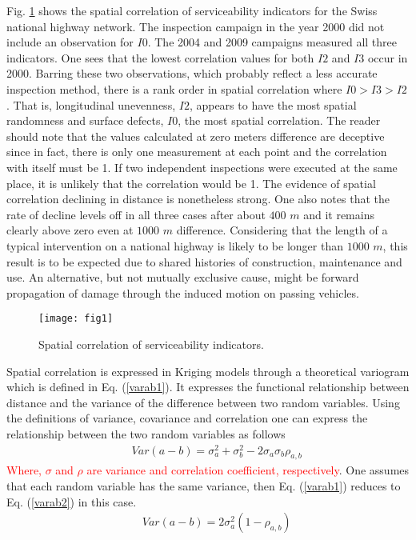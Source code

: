 \documentclass[Journal]{ascelike}
\begin{document}
Fig. \ref{fig1} shows the spatial correlation of serviceability indicators for the Swiss national highway network. The 
inspection campaign in the year 2000 did not include an observation for $I0$. The 2004 and 2009 campaigns measured all three indicators. One sees that the lowest correlation values for both $I2$ and $I3$ occur in 2000. Barring these two observations, which probably reflect a less accurate inspection method, there is a rank order in spatial correlation where $I0 > I3 > I2$. That is, longitudinal unevenness, $I2$, appears to have the most spatial randomness and surface defects, $I0$, the most spatial correlation. The reader should note that the values calculated at zero meters difference are deceptive since in fact, there is only one measurement at each point and the correlation with itself must be 1. If two independent inspections were executed at the same place, it is unlikely that the correlation would be 1. The evidence of spatial correlation declining in distance is nonetheless strong. One also notes that the rate of decline levels off in all three cases after about $400$ $m$ and it remains clearly above zero even at $1000$ $m$ difference. Considering that the length of a typical intervention on a national highway is likely to be longer than $1000$ $m$, this result is to be expected due to shared histories of construction, maintenance and use. An alternative, but not mutually exclusive cause, might be forward propagation of damage through the induced motion on passing vehicles.
%
\begin{figure}
\centering
\texttt{[image: fig1]} 
\caption{Spatial correlation of serviceability indicators.} 
\label{fig1}
\end{figure}
%
Spatial correlation is expressed in Kriging models through a theoretical variogram which is defined in Eq. (\ref{varab1}). It 
expresses the functional relationship between distance and the variance of the difference between two random variables. 
Using the definitions of variance, covariance and correlation one can express the relationship between the two random 
variables as follows
\begin{eqnarray}
&& Var(a-b)=\sigma_a^2+\sigma_b^2-2\sigma_a\sigma_b\rho_{a,b}\label{varab1}
\end{eqnarray}
\textcolor{red}{Where, $\sigma$ and $\rho$ are variance and correlation coefficient, respectively}. One assumes that each random variable has the same variance, then Eq. (\ref{varab1}) reduces to Eq. (\ref{varab2}) in this case.
\begin{eqnarray}
&& Var(a-b)=2\sigma_a^2(1-\rho_{a,b})\label{varab2}
\end{eqnarray}
\end{document}
